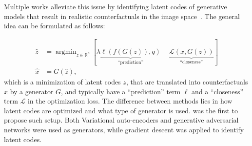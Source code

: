 \documentclass[11pt,a4paper,twoside,openright,final]{memoir}
\makeatletter
\DeclareMathOperator*{\argmin}{\arg\min}
\def\ifdraft{\ifdim\overfullrule>\z@
  \expandafter\@firstoftwo\else\expandafter\@secondoftwo\fi}
\newcommand{\content}[1]{{
    \ifdraft{
        \textcolor{pink}{
            \textbf{\\$\blacktriangleright$} #1\textbf{$\blacktriangleleft$}\\}
    }{}}}
\makeatother
\begin{document}

 
Multiple works alleviate this issue by identifying latent codes of generative models that result in realistic counterfactuals in the image space~\cite{Joshi2018, Rodriguez2021, Singla2019, flowcounterfactuals}.
The general idea can be formulated as follows: 

\begin{align}\label{eq:generator-cf}
    \hat z &= \argmin_{z\in \mathbb{R}^d} [ 
        \lambda   \underbrace{\ell(f(G(z)) , q)}_{\text{``prediction''}}
        +            \underbrace{\mathcal{L}(x , G(z))}_{\text{``closeness''}}]\\
    \hat x &= G(\hat z),
\end{align} 
which is a minimization of latent codes $z$, that are translated into counterfactuals $\hat x$ by a generator $G$, and typically have a ``prediction'' term $\ell$ and a ``closeness'' term $\mathcal{L}$ in the optimization loss.
The difference between methods lies in how latent codes are optimized and what type of generator is used. 
\cite{Joshi2018} was the first to propose such setup.
Both Variational auto-encoders and generative adversarial networks were used as generators, while gradient descent was applied to identify latent codes. 
\end{document}

